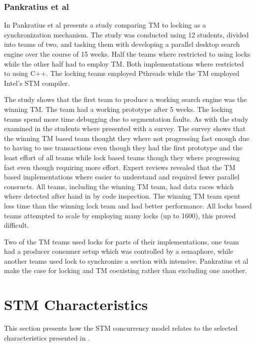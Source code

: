 \subsubsection{Pankratius et al}
\label{sec:stm_ease_pankratius}
In \cite{pankratius2009does} Pankratius et al presents a study comparing \ac{TM} to locking as a synchronization mechanism. The study was conducted using 12 students, divided into teams of two, and tasking them with developing a parallel desktop search engine over the course of 15 weeks. Half the teams where restricted to using locks while the other half had to employ \ac{TM}. Both implementations where restricted to using C++. The locking teams employed Pthreads\cite[p. 2]{pankratius2009does} while the \ac{TM} employed Intel’s STM compiler\cite[p. 3]{pankratius2009does}.

The study shows that the first team to produce a working search engine was the winning \ac{TM}\cite[p. 6]{pankratius2009does}. The team had a working prototype after 5 weeks.   The locking teams spend more time debugging due to segmentation faults\cite[p. 6]{pankratius2009does}. As with the study examined in  the students where presented with a survey. The survey shows that the  winning \ac{TM} based team thought they where not progressing fast enough due to having to use transactions even though they had the first prototype and the least effort of all teams while lock based teams though they where progressing fast even though requiring more effort\cite[p. 6]{pankratius2009does}. Expert reviews revealed that the \ac{TM} based implementations where easier to understand and required fewer parallel consructs\cite[p. 6]{pankratius2009does}. All teams, including the winning \ac{TM} team, had data races which where detected after hand in by code inspection\cite[p. 6]{pankratius2009does}. The winning \ac{TM} team spent less time than the winning lock team and had better performance\cite[p. 23]{pankratius2009does}. All locks based teams attempted to scale by employing many locks (up to 1600),  this proved difficult\cite[p. 23]{pankratius2009does}.

Two of the \ac{TM} teams used locks for parts of their implementations, one team had a producer consumer setup which was controlled by a semaphore, while another teams used lock to synchronize a section with intensive\cite[p. 5]{pankratius2009does}. Pankratius et al make the case for locking and \ac{TM} coexisting rather than excluding one another.

\section{\acs{STM} Characteristics}
\label{sec:stm_eval}
This section presents how the \ac{STM} concurrency model relates to the selected characteristics presented in . 

